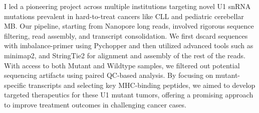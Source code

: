 \documentclass[10pt,letterpaper]{moderncv}
\begin{document}
{}{I led a pioneering project across multiple institutions targeting novel U1 snRNA mutations prevalent in hard-to-treat cancers like CLL and pediatric cerebellar MB. Our pipeline, starting from Nanopore long reads, involved rigorous sequence filtering, read assembly, and transcript consolidation. We first dscard sequences with imbalance-primer using Pychopper and then utilized advanced tools such as minimap2, and StringTie2 for alignment and assembly of the rest of the reads. With access to both Mutant and Wildtype samples, we filtered out potential sequencing artifacts using paired QC-based analysis. By focusing on mutant-specific transcripts and selecting key MHC-binding peptides, we aimed to develop targeted therapeutics for these U1 mutant tumors, offering a promising approach to improve treatment outcomes in challenging cancer cases.}
\end{document}
